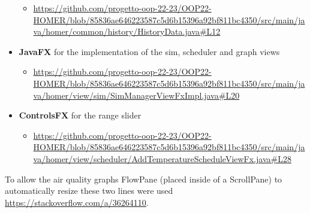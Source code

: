 \begin{itemize}
\begin{itemize}
        \item \url{https://github.com/progetto-oop-22-23/OOP22-HOMER/blob/85836ae646223587c5d6b15396a92bf811bc4350/src/main/java/homer/common/history/HistoryData.java#L12}
    \end{itemize}
    \item \textbf{JavaFX} for the implementation of the sim, scheduler and graph views
    \begin{itemize}
        \item \url{https://github.com/progetto-oop-22-23/OOP22-HOMER/blob/85836ae646223587c5d6b15396a92bf811bc4350/src/main/java/homer/view/sim/SimManagerViewFxImpl.java#L20}
    \end{itemize}
    \item \textbf{ControlsFX} for the range slider
    \begin{itemize}
        \item \url{https://github.com/progetto-oop-22-23/OOP22-HOMER/blob/85836ae646223587c5d6b15396a92bf811bc4350/src/main/java/homer/view/scheduler/AddTemperatureScheduleViewFx.java#L28}
    \end{itemize}
\end{itemize}

To allow the air quality graphs FlowPane (placed inside of a ScrollPane) to automatically resize these two lines were used \url{https://stackoverflow.com/a/36264110}.
